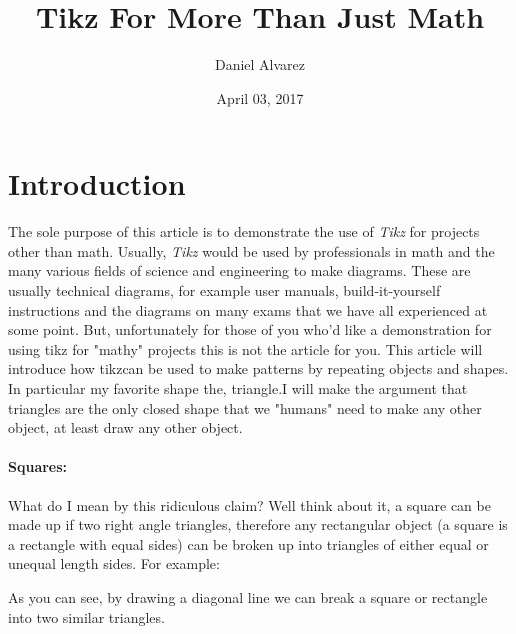 \documentclass[11pt]{article}
\begin{document}
	\title{Tikz For More Than Just Math}
	\author{Daniel Alvarez}
	\date{April 03, 2017}
	
	\maketitle
\section{Introduction}
The sole purpose of this article is to demonstrate the use of \emph{Tikz} for projects other than math.
Usually, \emph{Tikz} would be used by professionals in math and the many various fields of science and engineering
to make diagrams. These are usually technical diagrams, for example user manuals, build-it-yourself instructions and  
the diagrams on many exams that we have all experienced at some point. But, unfortunately for those of you who'd like a
demonstration for using tikz for "mathy" projects this is not the article for you. This article will introduce how tikzcan 
be used to make patterns by repeating objects and shapes. In particular my favorite shape the, triangle.I will make the argument that triangles are the only closed shape that we "humans" need to make any other object, 
at least draw any other object.
\\
\paragraph{Squares:}
What do I mean by this ridiculous claim? Well think about it, a square can be 
made up if two right angle triangles, therefore any rectangular object (a square is a rectangle with equal sides) 
can be broken up into triangles of either equal or unequal length sides. For example:\\

As you can see, by drawing a diagonal line we can break a square or rectangle into two similar triangles. 
\end{document}
